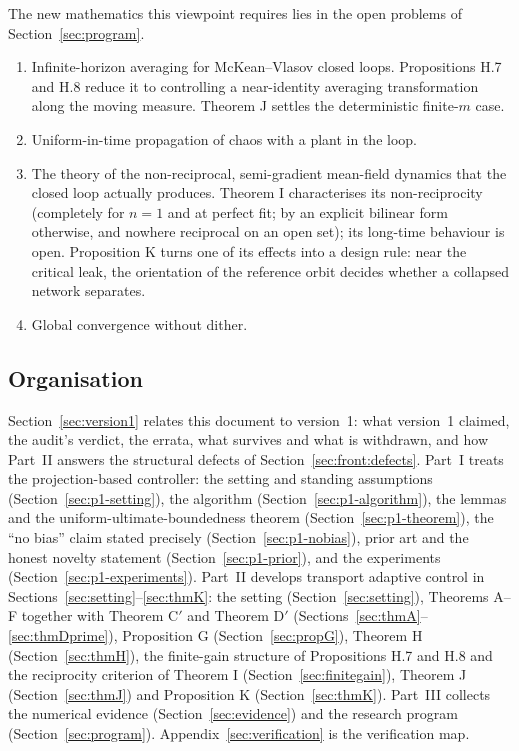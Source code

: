 The new mathematics this viewpoint requires lies in the open problems of Section~\ref{sec:program}.
\begin{enumerate}
  \item Infinite-horizon averaging for McKean--Vlasov closed loops. Propositions H.7 and H.8 reduce it to
    controlling a near-identity averaging transformation along the moving measure. Theorem J settles the
    deterministic finite-$m$ case.
  \item Uniform-in-time propagation of chaos with a plant in the loop.
  \item The theory of the non-reciprocal, semi-gradient mean-field dynamics that the closed loop actually produces.
    Theorem I characterises its non-reciprocity (completely for $n = 1$ and at perfect fit; by an explicit bilinear
    form otherwise, and nowhere reciprocal on an open set); its long-time behaviour is open. Proposition K turns one
    of its effects into a design rule: near the critical leak, the orientation of the reference orbit decides whether
    a collapsed network separates.
  \item Global convergence without dither.
\end{enumerate}

\subsection{Organisation}

Section~\ref{sec:version1} relates this document to version~1: what version~1 claimed, the audit's verdict, the
errata, what survives and what is withdrawn, and how Part~II answers the structural defects of
Section~\ref{sec:front:defects}. Part~I treats the projection-based controller: the setting and standing
assumptions (Section~\ref{sec:p1-setting}), the algorithm (Section~\ref{sec:p1-algorithm}), the lemmas and the
uniform-ultimate-boundedness theorem (Section~\ref{sec:p1-theorem}), the ``no bias'' claim stated precisely
(Section~\ref{sec:p1-nobias}), prior art and the honest novelty statement (Section~\ref{sec:p1-prior}), and the
experiments (Section~\ref{sec:p1-experiments}). Part~II develops transport adaptive control in
Sections~\ref{sec:setting}--\ref{sec:thmK}: the setting (Section~\ref{sec:setting}), Theorems A--F together with
Theorem C$'$ and Theorem D$'$ (Sections~\ref{sec:thmA}--\ref{sec:thmDprime}), Proposition G
(Section~\ref{sec:propG}), Theorem H (Section~\ref{sec:thmH}), the finite-gain structure of Propositions H.7 and H.8
and the reciprocity criterion of Theorem I (Section~\ref{sec:finitegain}), Theorem J (Section~\ref{sec:thmJ}) and
Proposition K (Section~\ref{sec:thmK}).
Part~III collects the numerical evidence (Section~\ref{sec:evidence}) and the research program
(Section~\ref{sec:program}). Appendix~\ref{sec:verification} is the verification map.

